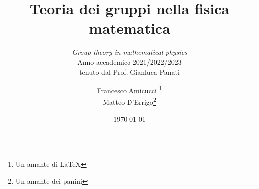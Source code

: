 \documentclass[
	fontsize=10pt, %
	twoside=false, %
	numbers=noenddot, %
]{kaobook}
\begin{document}

\titlehead{The \texttt{kaobook} class}
\subject{Appunti del corso di}

\title[Teoria dei gruppi nella fisica matematica]{Teoria dei gruppi nella fisica matematica}
\subtitle{\textit{Group theory in mathematical physics}\\Anno accademico 2021/2022/2023\\ tenuto dal Prof. Gianluca Panati}

\author[Francesco Amicucci]{Francesco Amicucci \thanks{Un amante di \LaTeX}\\Matteo D'Errigo\thanks{Un amante dei panini}}

\date{\today}

\publishers{Nemo}


\frontmatter %




\makeatletter
\uppertitleback{\@titlehead} %
\end{document}
